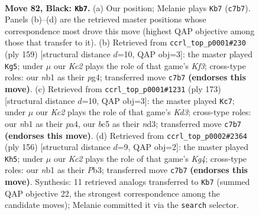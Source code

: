 \documentclass[11pt]{article}
\begin{document}
\clearpage

\begin{figure}[p]\centering
\begin{subfigure}{0.46\textwidth}\centering
\resizebox{\linewidth}{!}{%
\newchessgame
\chessboard[
  setfen={8/2k5/8/2B5/p1p3b1/8/5K2/1N6 b - - 19 82},
  showmover=false,
  pgfstyle=straightmove, color=movearrow, markmove={c7-b7}
]}
\caption{}
\end{subfigure}\hfill
\begin{subfigure}{0.46\textwidth}\centering
\resizebox{\linewidth}{!}{%
\newchessgame
\chessboard[
  setfen={1b6/1P6/5k2/8/4K1P1/p7/8/1B6 b - - 3 80},
  showmover=false,
  pgfstyle=straightmove, color=movearrow, markmove={f6-g5}
]}
\caption{}
\end{subfigure}
\\[4pt]
\begin{subfigure}{0.46\textwidth}\centering
\resizebox{\linewidth}{!}{%
\newchessgame
\chessboard[
  setfen={8/8/3k4/p7/P7/3N4/1K2p3/8 b - - 19 87},
  showmover=false,
  pgfstyle=straightmove, color=movearrow, markmove={d6-c7}
]}
\caption{}
\end{subfigure}\hfill
\begin{subfigure}{0.46\textwidth}\centering
\resizebox{\linewidth}{!}{%
\newchessgame
\chessboard[
  setfen={8/4k3/7p/8/1b4K1/1P6/P7/8 w - - 2 79},
  showmover=false,
  pgfstyle=straightmove, color=movearrow, markmove={g4-h5}
]}
\caption{}
\end{subfigure}
\caption{\textbf{Move 82, Black: \texttt{Kb7}.} (a) Our position; Melanie plays \texttt{Kb7} (\texttt{c7b7}). Panels (b)--(d) are the retrieved master positions whose correspondence most drove this move (highest QAP objective among those that transfer to it). (b) Retrieved from \texttt{ccrl\_top\_p0001\#230} (ply 159) [structural distance $d$=10, QAP obj=3]: the master played \texttt{Kg5}; under $\mu$ our \emph{Kc2} plays the role of that game's \emph{Kf3}; cross-type roles: our \emph{n}b1 as their \emph{p}g4; transferred move \texttt{c7b7} \textbf{(endorses this move)}. (c) Retrieved from \texttt{ccrl\_top\_p0001\#1231} (ply 173) [structural distance $d$=10, QAP obj=3]: the master played \texttt{Kc7}; under $\mu$ our \emph{Kc2} plays the role of that game's \emph{Kd3}; cross-type roles: our \emph{n}b1 as their \emph{p}a4, our \emph{b}c5 as their \emph{n}d3; transferred move \texttt{c7b7} \textbf{(endorses this move)}. (d) Retrieved from \texttt{ccrl\_top\_p0002\#2364} (ply 156) [structural distance $d$=9, QAP obj=2]: the master played \texttt{Kh5}; under $\mu$ our \emph{Kc2} plays the role of that game's \emph{Kg4}; cross-type roles: our \emph{n}b1 as their \emph{P}b3; transferred move \texttt{c7b7} \textbf{(endorses this move)}. Synthesis: 11 retrieved analogs transferred to \texttt{Kb7} (summed QAP objective 22, the strongest correspondence among the candidate moves); Melanie committed it via the \texttt{search} selector.}
\label{fig:thought-m163}
\end{figure}
\end{document}
